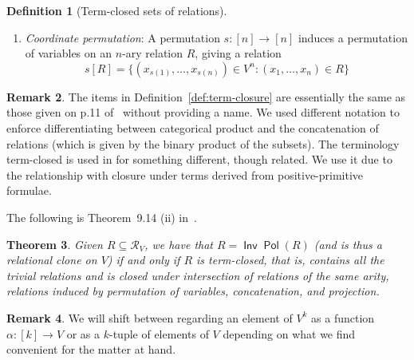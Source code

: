 \documentclass[11pt, a4paper, twoside,leqno]{amsart}
\def\blue{\leavevmode\color{blue}}%
\newcommand{\R}{{\mathcal R}}
\numberwithin{equation}{section}
\theoremstyle{plain}
\newtheorem{Thm}{Theorem}
\theoremstyle{definition}
\newtheorem{Defn}[Thm]{Definition}
\newtheorem{Rk}[Thm]{Remark}
\DeclareMathOperator{\Pol}{\mathsf{Pol}}
\DeclareMathOperator{\Inv}{\mathsf{Inv}}
\begin{document}
\begin{Defn}[Term-closed sets of relations]
\begin{enumerate}
  \item
    \label{it:permut}
    \emph{Coordinate permutation}:
    A permutation \(s \colon [n]
    \rightarrow [n]\)
    induces a permutation of variables on an \(n\)-ary relation \(R\), giving a
    relation
    \begin{equation*}
      s[R] =  \{ (x_{s(1)},\ldots,x_{s(n)}) \in V^{n} : (x_{1}, \ldots , x_{n})\in R \}
    \end{equation*}
  \end{enumerate}
\end{Defn}

\begin{Rk}
  \label{rk:def:term-closure}
  The items in Definition~\ref{def:term-closure} are essentially the
  same as those given
  on p.11 of~\cite{Freese:2022aa} without providing a name. We used different notation to
  enforce differentiating between
  categorical product and the concatenation of relations (which is
  given by the binary product of the subsets). The terminology
  term-closed is used in
  \cite{Clark:1998aa} for something different, though related. We use
  it due to the relationship with closure under terms derived from
  positive-primitive formulae.
\end{Rk}


The following is Theorem~9.14 (ii)  in~\cite{Freese:2022aa}.
\begin{Thm}
  \label{thm:closure-coclone}
  Given \(R \subseteq \R_{V}\), we have that \(R = \Inv\Pol(R)\) (and
  is thus a relational clone on \(V\)) if and only if \(R\) is term-closed,
  that is, contains all the
  trivial relations and is closed under intersection of relations of
  the same arity, relations induced by permutation of variables,
  concatenation, and projection. 
\end{Thm}

\begin{Rk}
  \label{rk:15}
  We will shift between regarding an element of \(V^{k}\)
  as a function \(\alpha \colon [k] \rightarrow V\) or as a
  \(k\)-tuple of elements of \(V\) depending on what we find
  convenient for the matter at hand.
\end{Rk}
\end{document}
